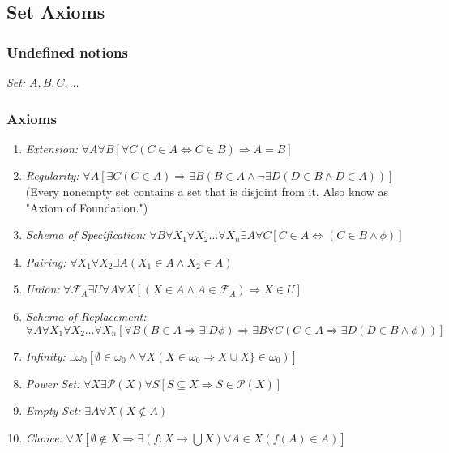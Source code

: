 \subsection{Set Axioms}\label{setaxioms}

\subsubsection{Undefined notions}
\emph{Set:} $A,B,C,\dots$

\subsubsection{Axioms}\label{statementofsetaxioms}
\begin{enumerate}
  \item \emph{Extension:} $\forall A \forall B [\forall C ( C \in A \Leftrightarrow C \in B ) \Rightarrow A = B ]$
  \item \emph{Regularity:} $\forall A [\exists C (C \in A) \Rightarrow \exists B ( B \in A \land \lnot \exists D (D \in B \land D \in A))]$ \newline
  {\small (Every nonempty set contains a set that is disjoint from it. Also know as "Axiom of Foundation.")}
  \item \emph{Schema of Specification:} $\forall B \forall X_1 \forall X_2 \dots \forall X_n \exists A \forall C [C \in A \Leftrightarrow ( C \in B \land \phi)]$
  \item \emph{Pairing:} $\forall X_1 \forall X_2 \exists A (X_1 \in A \land X_2 \in A)$
  \item \emph{Union:} $\forall \mathcal{F}_A \exists U \forall A \forall X [(X \in A \land A \in \mathcal{F}_A) \Rightarrow X \in U]$
  \item \emph{Schema of Replacement:} $\forall A \forall X_1 \forall X_2 \dots \forall X_n[\forall B(B \in A \Rightarrow \exists! D \phi) \Rightarrow \exists B \forall C (C \in A \Rightarrow \exists D(D \in B \land \phi))]$
  \item \emph{Infinity:} $\exists \omega_0 [\emptyset \in \omega_0 \land \forall X(X \in \omega_0 \Rightarrow X \cup X\} \in \omega_0)]$
  \item \emph{Power Set:} $\forall X \exists \mathcal{P}(X) \forall S [S \subseteq X \Rightarrow S \in \mathcal{P}(X)]$
  \item \emph{Empty Set:} $\exists A \forall X (X \not\in A)$
  \item \emph{Choice:} $\forall X [\emptyset \not\in X \Rightarrow \exists (f:X \rightarrow \bigcup X) \forall A \in X (f(A) \in A)]$
\end{enumerate}

